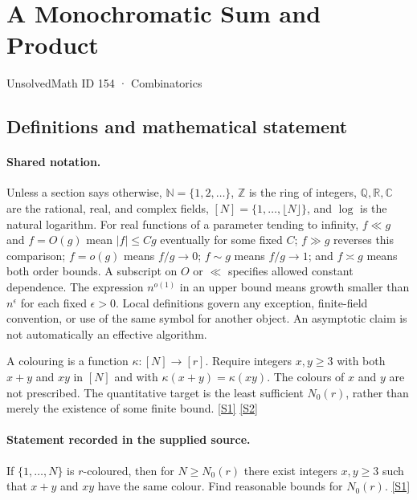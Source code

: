 \documentclass[11pt,a4paper]{article}
\newcommand{\N}{\mathbb{N}}
\newcommand{\Z}{\mathbb{Z}}
\newcommand{\Q}{\mathbb{Q}}
\newcommand{\R}{\mathbb{R}}
\newcommand{\C}{\mathbb{C}}
\newcommand{\sref}[2]{\hyperlink{source:#1:#2}{[S#2]}}
\begin{document}

\setcounter{section}{153}

\section{A Monochromatic Sum and Product}\label{154}

{\small\sffamily UnsolvedMath ID 154 · Combinatorics}

\subsection{Definitions and mathematical statement}

\paragraph{Shared notation.}Unless a section says otherwise, $\N=\{1,2,\ldots\}$,
$\Z$ is the ring of integers, $\Q,\R,\C$ are the rational, real, and complex
fields, $[N]=\{1,\ldots,\lfloor N\rfloor\}$, and $\log$ is the natural
logarithm. For real functions of a parameter tending to infinity,
$f\ll g$ and $f=O(g)$ mean $|f|\leq Cg$ eventually for some fixed $C$;
$f\gg g$ reverses this comparison; $f=o(g)$ means $f/g\to0$;
$f\sim g$ means $f/g\to1$; and $f\asymp g$ means both order bounds.
A subscript on $O$ or $\ll$ specifies allowed constant dependence.
The expression $n^{o(1)}$ in an upper bound means growth smaller than
$n^\epsilon$ for each fixed $\epsilon>0$. Local definitions govern any
exception, finite-field convention, or use of the same symbol for another
object. An asymptotic claim is not automatically an effective algorithm.



A colouring is a function $\kappa:[N]\to[r]$. Require integers $x,y\geq3$ with both $x+y$ and $xy$ in $[N]$ and with $\kappa(x+y)=\kappa(xy)$. The colours of $x$ and $y$ are not prescribed. The quantitative target is the least sufficient $N_0(r)$, rather than merely the existence of some finite bound. \sref{154}{1} \sref{154}{2}

\paragraph{Statement recorded in the supplied source.}
If $\{1, \dots, N\}$ is $r$-coloured, then for $N \geq N_0(r)$ there exist integers $x, y \geq 3$ such that $x+y$ and $xy$ have the same colour. Find reasonable bounds for $N_0(r)$. \sref{154}{1}
\end{document}
